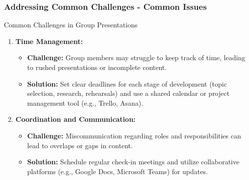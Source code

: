 \documentclass[aspectratio=169]{beamer}
\begin{document}
\begin{frame}[fragile]
    \frametitle{Addressing Common Challenges - Common Issues}
    \begin{block}{Common Challenges in Group Presentations}
        \begin{enumerate}
            \item \textbf{Time Management:}
            \begin{itemize}
                \item \textbf{Challenge:} Group members may struggle to keep track of time, leading to rushed presentations or incomplete content.
                \item \textbf{Solution:} Set clear deadlines for each stage of development (topic selection, research, rehearsals) and use a shared calendar or project management tool (e.g., Trello, Asana).
            \end{itemize}

            \item \textbf{Coordination and Communication:}
            \begin{itemize}
                \item \textbf{Challenge:} Miscommunication regarding roles and responsibilities can lead to overlaps or gaps in content.
                \item \textbf{Solution:} Schedule regular check-in meetings and utilize collaborative platforms (e.g., Google Docs, Microsoft Teams) for updates.
            \end{itemize}
        \end{enumerate}
    \end{block}
\end{frame}
\end{document}
